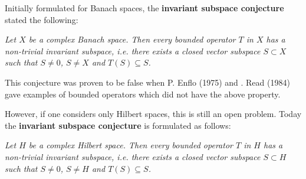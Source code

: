 \documentclass[12pt]{article}
\begin{document}
Initially formulated for Banach spaces, the {\bf invariant subspace conjecture} stated the following:

\emph{Let $X$ be a complex Banach space. Then every bounded operator $T$ in $X$ has a non-trivial  invariant subspace, i.e. there exists a closed vector subspace $S \subset X$ such that $S \neq 0$, $S \neq X$ and $T(S) \subseteq S$.}

This conjecture was proven to be false when P. Enflo (1975) and . Read (1984) gave examples of bounded operators which did not have the above property.

However, if one considers only Hilbert spaces, this is still an open problem. Today the {\bf invariant subspace conjecture}  is formulated as follows:

\emph{Let $H$ be a complex Hilbert space. Then every bounded operator $T$ in $H$ has a non-trivial  invariant subspace, i.e. there exists a closed vector subspace $S \subset H$ such that $S \neq 0$, $S \neq H$ and $T(S) \subseteq S$.}
\end{document}
